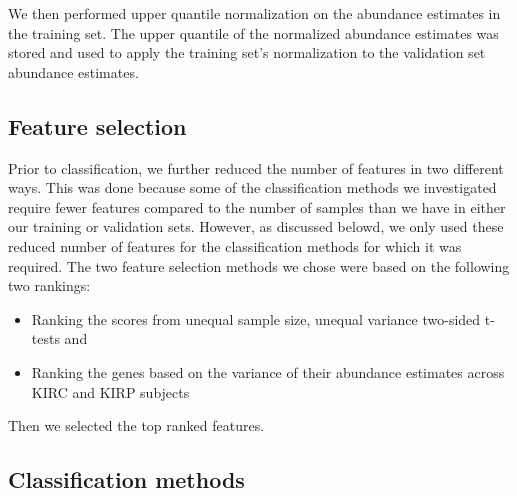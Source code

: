 We then performed upper quantile normalization on the abundance estimates in
the training set. The upper quantile of the normalized abundance estimates was
stored and used to apply the training set's normalization to the validation set
abundance estimates.

\subsection*{Feature selection}

Prior to classification, we further reduced the number of features in two
different ways.  This was done because some of the classification methods
we investigated require fewer features compared to the number of samples
than we have in either our training or validation sets.  However, as discussed
belowd, we only used these reduced number of features for the classification
methods for which it was required.  The two feature selection methods we
chose were based on the following two rankings:

\begin{itemize}

\item Ranking the scores from unequal sample size, unequal variance
two-sided t-tests and

\item Ranking the genes based on the variance of their abundance estimates across
KIRC and KIRP subjects

\end{itemize}

Then we selected the  top ranked features.







%
%



\subsection*{Classification methods}

